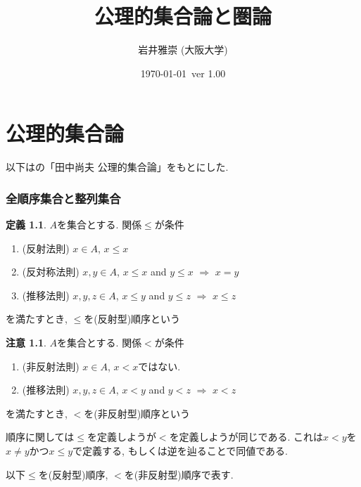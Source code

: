 \documentclass[dvipdfmx,a4paper,11pt]{report}
\title{公理的集合論と圏論}
\author{岩井雅崇 (大阪大学)}
\date{\today \, ver 1.00}
\theoremstyle{definition}
\newtheorem{dfn}[thm]{定義}
\newtheorem{rem}[thm]{注意}
\begin{document}
\maketitle
\tableofcontents


\chapter{公理的集合論}


以下は\cite{Tana}の「田中尚夫 公理的集合論」をもとにした. 


\subsection{全順序集合と整列集合}
 \begin{tcolorbox}[colback = white, colframe = green!35!black, fonttitle = \bfseries,breakable = true]
 \begin{dfn}
 $A$を集合とする. 関係$\le$が条件
 \begin{enumerate}
 \item (反射法則) $x \in A$, $x \le x$
 \item (反対称法則) $x,y \in A$, $x \le x$ and $y \le x$ $\Rightarrow$ $x=y$
 \item (推移法則) $x,y, z\in A$, $x \le y$ and $y \le z$ $\Rightarrow$ $x\le z$
 \end{enumerate}
を満たすとき, $\le$を(反射型)順序という
\end{dfn}
 \end{tcolorbox}
 \begin{rem}
  $A$を集合とする. 関係$<$が条件
   \begin{enumerate}
 \item (非反射法則) $x \in A$, $x < x$ではない. 
 \item (推移法則) $x,y, z\in A$, $x < y$ and $y < z$ $\Rightarrow$ $x < z$
 \end{enumerate}
を満たすとき, $<$を(非反射型)順序という

順序に関しては$\le$を定義しようが$<$を定義しようが同じである. 
これは$x< y$を$x \neq y$かつ$x \le y$で定義する, もしくは逆を辿ることで同値である.

以下$\le$を(反射型)順序, $<$を(非反射型)順序で表す. 
 \end{rem}
\end{document}
